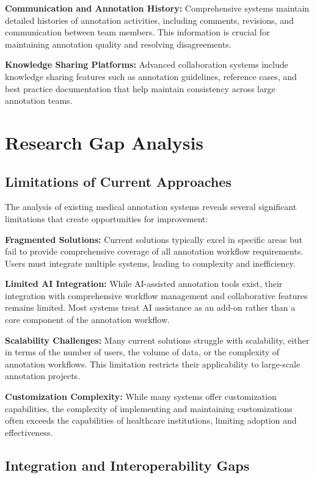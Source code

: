 \textbf{Communication and Annotation History:} Comprehensive systems maintain detailed histories of annotation activities, including comments, revisions, and communication between team members. This information is crucial for maintaining annotation quality and resolving disagreements.

\textbf{Knowledge Sharing Platforms:} Advanced collaboration systems include knowledge sharing features such as annotation guidelines, reference cases, and best practice documentation that help maintain consistency across large annotation teams.

\section{Research Gap Analysis}

\subsection{Limitations of Current Approaches}

The analysis of existing medical annotation systems reveals several significant limitations that create opportunities for improvement:

\textbf{Fragmented Solutions:} Current solutions typically excel in specific areas but fail to provide comprehensive coverage of all annotation workflow requirements. Users must integrate multiple systems, leading to complexity and inefficiency.

\textbf{Limited AI Integration:} While AI-assisted annotation tools exist, their integration with comprehensive workflow management and collaborative features remains limited. Most systems treat AI assistance as an add-on rather than a core component of the annotation workflow.

\textbf{Scalability Challenges:} Many current solutions struggle with scalability, either in terms of the number of users, the volume of data, or the complexity of annotation workflows. This limitation restricts their applicability to large-scale annotation projects.

\textbf{Customization Complexity:} While many systems offer customization capabilities, the complexity of implementing and maintaining customizations often exceeds the capabilities of healthcare institutions, limiting adoption and effectiveness.

\subsection{Integration and Interoperability Gaps}

